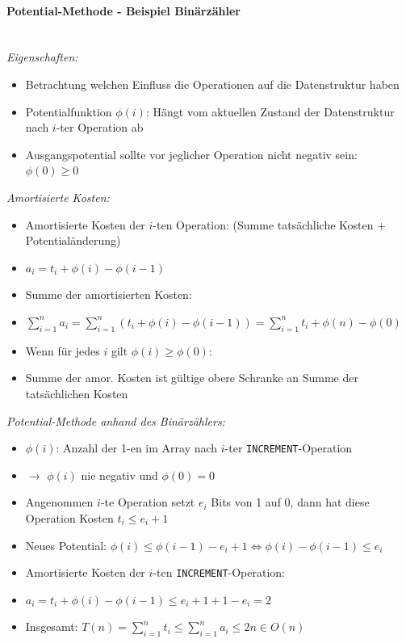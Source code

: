 \documentclass[
    ngerman,
    color=3b,
    dark_mode,
    load_common, %
    summary,
    boxarc,
]{tuda_summary}
\begin{document}
\pagebreak

\paragraph{Potential-Methode - Beispiel Binärzähler}\mbox{}\vspace{-1em}\\

\textit{Eigenschaften:}
\begin{itemize}
    \item Betrachtung welchen Einfluss die Operationen auf die Datenstruktur haben
    \item Potentialfunktion $\phi(i)$: Hängt vom aktuellen Zustand der Datenstruktur nach $i$-ter Operation ab
    \item Ausgangspotential sollte vor jeglicher Operation nicht negativ sein: $\phi(0) \geq 0$
\end{itemize}

\textit{Amortisierte Kosten:}
\begin{itemize}
    \item Amortisierte Kosten der $i$-ten Operation: (Summe tatsächliche Kosten + Potentialänderung)
    \item[] $a_i = t_i + \phi(i) - \phi(i-1)$
    \item Summe der amortisierten Kosten:
    \item[] $\sum^n_{i=1} a_i = \sum^n_{i=1} (t_i + \phi(i) - \phi(i - 1)) = \sum^n_{i=1} t_i + \phi(n) - \phi(0)$
    \item Wenn für jedes $i$ gilt $\phi(i) \geq \phi(0)$:
    \item[] Summe der amor. Kosten ist gültige obere Schranke an Summe der tatsächlichen Kosten
\end{itemize}

\textit{Potential-Methode anhand des Binärzählers:}
\begin{itemize}
    \item $\phi(i)$: Anzahl der 1-en im Array nach $i$-ter \texttt{INCREMENT}-Operation
    \item[] $\rightarrow$ $\phi(i)$ nie negativ und $\phi(0) = 0$
    \item Angenommen $i$-te Operation setzt $e_i$ Bits von 1 auf 0, dann hat diese Operation Kosten $t_i \leq e_i + 1$
    \item Neues Potential: $\phi(i) \leq \phi(i-1) - e_i + 1 \Leftrightarrow \phi(i) - \phi(i-1) \leq e_i$
    \item Amortisierte Kosten der $i$-ten \texttt{INCREMENT}-Operation:
    \item[] $a_i = t_i + \phi(i) - \phi(i-1) \leq e_i + 1 + 1 - e_i = 2$
    \item Insgesamt: $T(n) = \sum^n_{i=1} t_i \leq \sum^n_{i=1} a_i \leq 2n \in O(n)$
\end{itemize}

\clearpage
\end{document}
